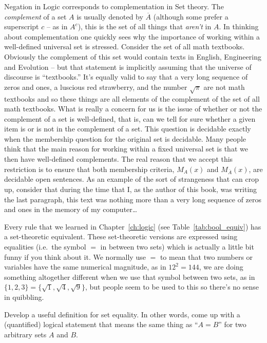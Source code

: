 Negation in Logic corresponds to 
complementation in Set theory.  The 
\emph{complement} of a set $A$ is usually denoted by $\overline{A}$ 
(although some prefer a superscript $c$ -- as in $A^c$), this is the set
of all things that \emph{aren't} in $A$.  In thinking about complementation
one quickly sees why the importance of working within a well-defined
universal set is stressed.  Consider the set of all math textbooks.
Obviously the complement of this set would contain texts in English,
Engineering and Evolution -- but that statement is implicitly 
assuming that the universe of discourse is ``textbooks.''   It's equally
valid to say that a very long sequence of zeros and ones, a luscious 
red strawberry, and the number $\sqrt{\pi}$ 
are not math textbooks and so
these things are all elements of the complement of the set of all math
textbooks.  What is really a concern for us is the issue of whether or not
the complement of a set is well-defined, that is, can we tell for sure
whether a given item is or is not in the complement of a set.  This 
question is decidable exactly when the membership question for the
original set is decidable.   Many people think that the main
reason for working within a fixed universal set is that we then 
have well-defined complements.  The real reason that we accept
this restriction is to ensure that both membership criteria,
$M_A(x)$ and $M_{\overline{A}}(x)$, are decidable open sentences.
As an example of the sort of strangeness that can crop up, consider that
during the time that I, as the author of this book, was writing the 
last paragraph, this text was nothing more than a very long
sequence of zeros and ones in the memory of my computer\ldots

Every rule that we learned in Chapter~\ref{ch:logic} 
(see Table~\ref{tab:bool_equiv}) has a set-theoretic equivalent.  
These set-theoretic versions are
expressed using equalities (i.e.\ the symbol $=$ in between two sets) which
is actually a little bit funny if you think about it.  We normally
use $=$ to mean that two numbers or variables have the same numerical
magnitude, as in $12^2 = 144$, we are doing something altogether
different when we use that symbol between two sets, as in $\{1,2,3\}=
\{\sqrt{1},\sqrt{4},\sqrt{9}\}$, but people seem to be used to this
so there's no sense in quibbling.

\begin{exer}
Develop a useful definition for set equality.  In other words,
come up with a (quantified) logical statement that means the
same thing as ``$A = B$'' for two arbitrary sets $A$ and $B$.
\end{exer}

